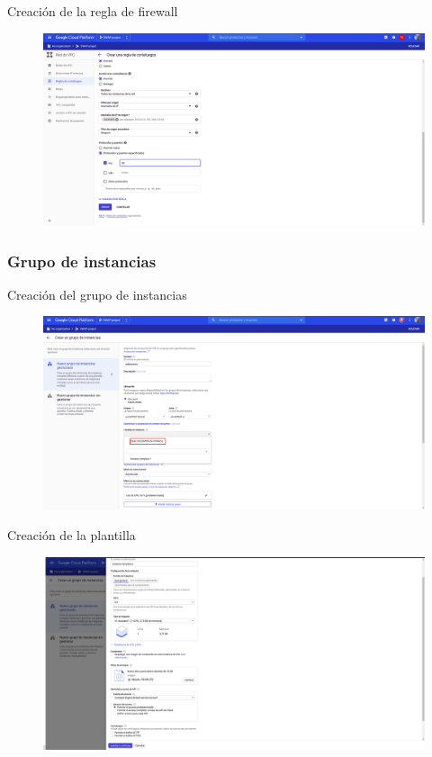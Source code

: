 \documentclass{beamer}
\begin{document}
\begin{frame}[fragile]{Creación de la regla de firewall}
  \begin{figure}[H]
		\centering
		\includegraphics[width=\textwidth]{project/firewall_creation.png}
	\end{figure}
\end{frame}

\subsubsection{Grupo de instancias}


\begin{frame}[fragile]{Creación del grupo de instancias}
  \begin{figure}[H]
		\centering
		\includegraphics[width=\textwidth]{project/createig.png}
	\end{figure}
\end{frame}

\begin{frame}[fragile]{Creación de la plantilla}
  \begin{figure}[H]
		\centering
		\includegraphics[width=\textwidth]{project/createtemplate.png}
	\end{figure}
\end{frame}
\end{document}

